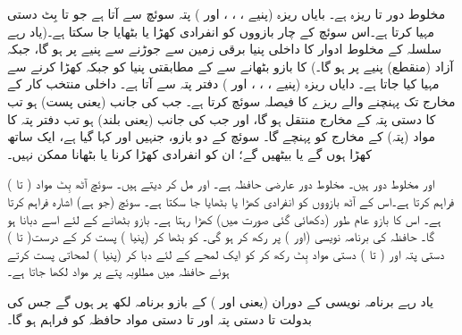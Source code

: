  مخلوط دور      تا  ریزہ ہے۔ بایاں ریزہ (پنیے ، ، ، اور )  پتہ سوئچ  سے آتا ہے جو  تا  بِٹ دستی  مہیا کرتا ہے۔اس سوئچ کے چار بازووں کو انفرادی کھڑا یا بٹھایا جا سکتا ہے۔(یاد رہے    سلسلہ کے مخلوط ادوار کا داخلی  پنیا برقی زمین سے جوڑنے سے پنیے پر    ہو گا، جبکہ آزاد (منقطع)   پنیے   پر   ہو گا۔)       کا  بازو  بٹھانے سے  کے مطابقتی پنیا کو   جبکہ کھڑا کرنے سے     مہیا کیا جاتا ہے۔  دایاں ریزہ (پنیے ، ، ، اور ) دفتر پتہ  سے آتا ہے۔ داخلی منتخب کار   کے مخارج تک پہنچنے والے ریزے   کا فیصلہ سوئچ   کرتا ہے۔ جب     کی جانب (یعنی پست)  ہو تب  کا  دستی پتہ   کے مخارج   منتقل ہو گا، اور جب   کی جانب  (یعنی بلند)    ہو تب دفتر پتہ  کا مواد  (پتہ)  کے مخارج کو پہنچے گا۔ سوئچ   کے دو بازو، جنہیں  اور  کہا گیا ہے، ایک ساتھ کھڑا ہوں گے یا بیٹھیں گے؛ ان کو انفرادی کھڑا کرنا  یا بٹھانا ممکن  نہیں۔
 
    اور  مخلوط دور  ہیں۔   مخلوط دور  عارضی حافظہ ہے۔   اور  مل کر   دیتے ہیں۔ سوئچ    آٹھ بِٹ مواد ( تا )  فراہم کرتا ہے۔اس کے آٹھ بازووں کو انفرادی کھڑا یا بٹھایا جا  سکتا  ہے۔ سوئچ    (جو  ہے)  
     اشارہ فراہم کرتا ہے۔ اس کا بازو عام طور      (دکھائی گئی صورت میں)  کھڑا رہتا ہے۔ بازو بٹھانے کے لئے اسے دبانا ہو گا۔ حافظہ کی برنامہ نویسی    (اور )    پر رکھ کر ہو گی۔ کو بٹھا کر  (پنیا )   پست کر کے  درست(     تا ) دستی پتہ  اور ( تا )  دستی مواد بِٹ    رکھ کر   کو ایک لمحے کے لئے دبا کر  (پنیا )    لمحاتی پست  کرتے ہوئے حافظہ میں  مطلوبہ پتے   پر مواد لکھا جاتا ہے۔
   
یاد رہے برنامہ نویسی کے دوران   (یعنی  اور ) کے بازو برنامہ لکھ پر ہوں گے جس کی بدولت  تا  دستی  پتہ اور  تا  دستی  مواد حافظہ کو فراہم ہو گا۔
   
